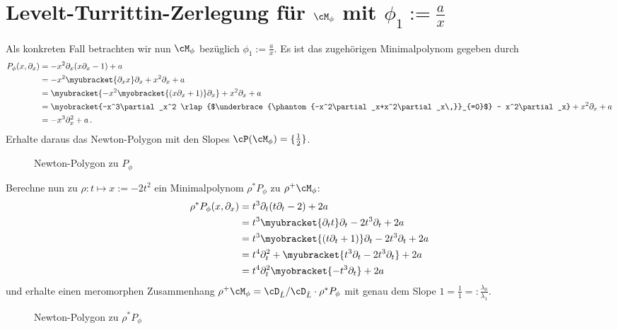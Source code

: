 \section{Levelt-Turrittin-Zerlegung für $\cM_{\phi}$ mit
  $\phi_1:=\frac{a}{x}$} \label{sec:LT-speziell}
\begin{comment}
rechtfertigen, das mehr gerechnet wird, als nötig
\end{comment}
Als konkreten Fall betrachten wir nun $\cM_{\phi}$ bezüglich
$\phi_1:=\frac{a}{x}$. 
Es ist das zugehörigen Minimalpolynom gegeben durch
\begin{align*}
P_{\phi}(x,\partial_x) &=-x^2\partial_x (x\partial_x-1)+a
\\&=-x^2\myubracket{\partial_xx}\partial_x+x^2\partial_x+a
\\&=\myubracket{-x^2\myobracket{(x\partial_x+1)}\partial_x} + x^2\partial_x
  + a
\\&=\myobracket{-x^3\partial_x^2
  \rlap{$\underbrace{\phantom{-x^2\partial_x+x^2\partial_x\,}}_{=0}$}
  - x^2\partial_x}+x^2\partial_x+a
\\&=-x^3\partial_x^2+a \,.
\end{align*}
Erhalte daraus das Newton-Polygon mit den Slopes
$\cP(\cM_{\phi})=\{\frac{1}{2}\}$.
\begin{figure}[H] %
\begin{center}
\end{center}
\caption{Newton-Polygon zu $P_{\phi}$}
\end{figure}
Berechne nun zu $\rho:t\mapsto x:=-2t^2$ ein Minimalpolynom $\rho^*P_{\phi}$
zu $\rho^+\cM_{\phi}$:
\begin{align*}
\rho^*P_{\phi}(x,\partial_x)
  &=t^{3}\partial_t(t\partial_t-2)+2a\\
  &=t^{3}\myubracket{\partial_tt}\partial_t-2t^{3}\partial_t+2a\\
  &=t^{3}\myobracket{(t\partial_t+1)}\partial_t-2t^{3}\partial_t+2a\\
  &=t^{4}\partial_t^2+\myubracket{t^{3}\partial_t-2t^{3}\partial_t}+2a\\
  &=t^{4}\partial_t^2\myobracket{-t^{3}\partial_t}+2a
\end{align*}
und erhalte einen meromorphen Zusammenhang $\rho^+\cM_{\phi}=\cD_{\hat
L}/\cD_{\hat L}\cdot\rho^*P_{\phi}$ mit genau dem Slope
$1=\frac{1}{1}=:\frac{\lambda_0}{\lambda_1}$.
\begin{figure}[H]
\begin{center}
\end{center}
\caption{Newton-Polygon zu $\rho^*P_{\phi}$}
\end{figure}

